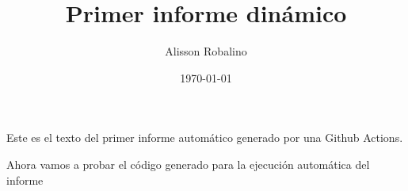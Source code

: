 \documentclass[12pt, a4paper]{book}
\title{Primer informe dinámico}
\author{Alisson Robalino}
\date{\today}
\begin{document}
\maketitle
Este es el texto del primer informe automático generado por una Github Actions.

Ahora vamos a probar el código generado para la ejecución automática del informe
\end{document}
